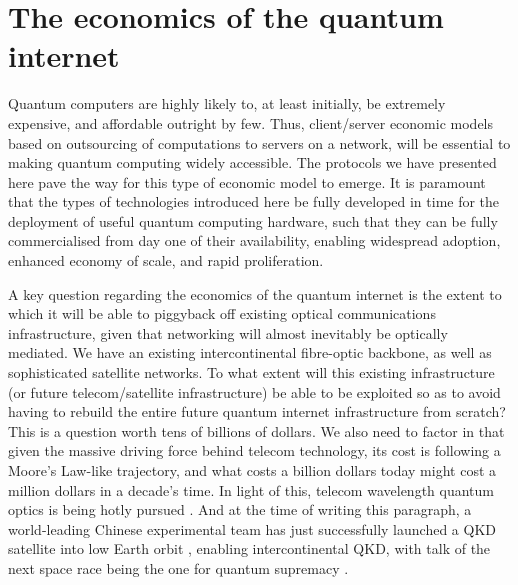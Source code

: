 \documentclass[aps,rmp,twocolumn,amsmath,amssymb,nofootinbib,superscriptaddress]{revtex4}
\newcommand{\comment}[1]{{\color{blue}{\textbf{#1}}}}
\begin{document}

%
%

\section{The economics of the quantum internet} \label{sec:economics}

Quantum computers are highly likely to, at least initially, be extremely expensive, and affordable outright by few. Thus, client/server economic models based on outsourcing of computations to servers on a network, will be essential to making quantum computing widely accessible. The protocols we have presented here pave the way for this type of economic model to emerge. It is paramount that the types of technologies introduced here be fully developed in time for the deployment of useful quantum computing hardware, such that they can be fully commercialised from day one of their availability, enabling widespread adoption, enhanced economy of scale, and rapid proliferation.

A key question regarding the economics of the quantum internet is the extent to which it will be able to piggyback off existing optical communications infrastructure, given that networking will almost inevitably be optically mediated. We have an existing intercontinental fibre-optic backbone, as well as sophisticated satellite networks. To what extent will this existing infrastructure (or future telecom/satellite infrastructure) be able to be exploited so as to avoid having to rebuild the entire future quantum internet infrastructure from scratch? This is a question worth tens of billions of dollars. We also need to factor in that given the massive driving force behind telecom technology, its cost is following a Moore's Law-like trajectory, and what costs a billion dollars today might cost a million dollars in a decade's time. In light of this, telecom wavelength quantum optics is being hotly pursued \cite{???}. And at the time of writing this paragraph, a world-leading Chinese experimental team has just successfully launched a QKD satellite into low Earth orbit \cite{???}, enabling intercontinental QKD, with talk of the next space race being the one for quantum supremacy \cite{???}.
\end{document}
